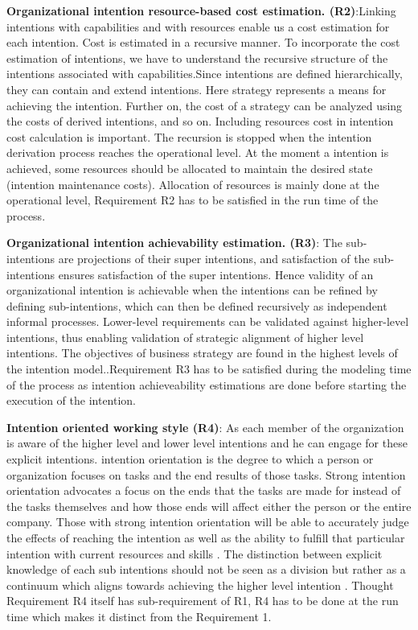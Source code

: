  \textbf{Organizational intention resource-based cost estimation. (R2)}:Linking intentions with capabilities and with resources enable us a cost estimation for each intention. Cost is estimated in a recursive manner. To incorporate the cost estimation of intentions, we have to understand the recursive structure of the intentions associated with capabilities.Since intentions are defined hierarchically, they can contain and extend intentions. Here strategy represents a means for achieving the intention. Further on, the cost of a strategy can be analyzed using the costs of derived  intentions, and so on. Including resources cost in intention cost calculation is important. The recursion is stopped when the intention derivation process reaches the operational
level. At the moment a  intention is achieved, some resources should be allocated to maintain the desired state (intention maintenance costs)\cite{Mandic2010}. Allocation of resources is mainly done at the operational level, Requirement R2 has to be satisfied in the run time of the process.

 \textbf{Organizational intention achievability estimation. (R3)}: The sub-intentions are projections of their super intentions, and satisfaction of the sub-intentions ensures satisfaction of the super intentions. Hence validity of an organizational intention is achievable when the intentions can be refined by defining sub-intentions, which can then be defined recursively as independent informal processes. Lower-level requirements can be validated against higher-level intentions, thus enabling validation of strategic alignment of  higher level intentions. The objectives of business strategy are found in the highest levels of the intention model.\cite{Bleistein2006}.Requirement R3 has to be satisfied during the modeling time of the process as intention achieveability estimations are done before starting the execution of the intention.

 \textbf{Intention oriented working style (R4)}: As each member of the organization is aware of the higher level and lower level intentions and he can engage for these explicit intentions. intention orientation is the degree to which a person or organization focuses on tasks and the end results of those tasks. Strong intention orientation advocates a focus on the ends that the tasks are made for instead of the tasks themselves and how those ends will affect either the person or the entire company. Those with strong intention orientation will be able to accurately judge the effects of reaching the intention as well as the ability to fulfill that particular intention with current resources and skills \cite{Lacom}. The distinction between explicit knowledge of each sub intentions should not be seen as a division but rather as a continuum which aligns towards achieving the higher level intention . Thought Requirement R4 itself has sub-requirement of R1, R4 has to be done at the run time which makes it distinct from the Requirement 1.


